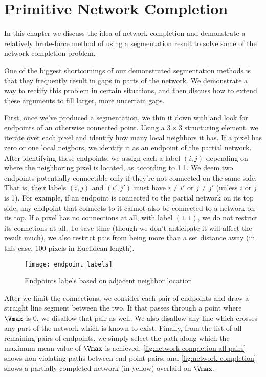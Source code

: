 \chapter{Primitive Network Completion}

In this chapter we discuss the idea of network completion and demonstrate a relatively brute-force method of using a segmentation result to solve some of the network completion problem.

One of the biggest shortcomings of our demonstrated segmentation methods is that they frequently result in gaps in parts of the network. We demonstrate a way to rectify this problem in certain situations, and then discuss how to extend these arguments to fill larger, more uncertain gaps.

First, once we've produced a segmentation, we thin it down with \autocite{thinning} and look for endpoints of an otherwise connected point. Using a $3\times 3$ structuring element, we iterate over each pixel and identify how many local neighbors it has. If a pixel has zero or one local neigbors, we identify it as an endpoint of the partial network. After identifying these endpoints, we assign each a label $(i,j)$ depending on where the neighboring pixel is located, as according to \cref{fig:endpoint_labels}. We deem two endpoints potentially connectible only if they're not connected on the same side. That is, their labels $(i,j)$ and $(i',j')$ must have $i\ne i'$ or $j\ne j'$ (unless $i$ or $j$ is 1). For example, if an endpoint is connected to the partial network on its top side, any endpoint that connects to it cannot also be connected to a network on its top. If a pixel has no connections at all, with label $(1,1)$, we do not restrict its connetions at all. To save time (though we don't anticipate it will affect the result much), we also restrict pais from being more than a set distance away (in this case, 100 pixels in Euclidean length).

\begin{figure}
	\texttt{[image: endpoint\_labels]}
	\caption{Endpoints labels based on adjacent neighbor location}
	\label{fig:endpoint_labels}
\end{figure}

After we limit the connections, we consider each pair of endpoints and draw a straight line segment between the two. If that passes through a point where $\Vmax$ is 0, we disallow that pair as well. We also disallow any line which crosses any part of the network which is known to exist.
Finally, from the list of all remaining pairs of endpoints, we simply select the path along which the maximum mean value of $\Vmax$ is achieved. \cref{fig:network-completion-all-pairs} shows non-violating paths between end-point pairs, and \cref{fig:network-completion} shows a partially completed network (in yellow) overlaid on $\Vmax$.



